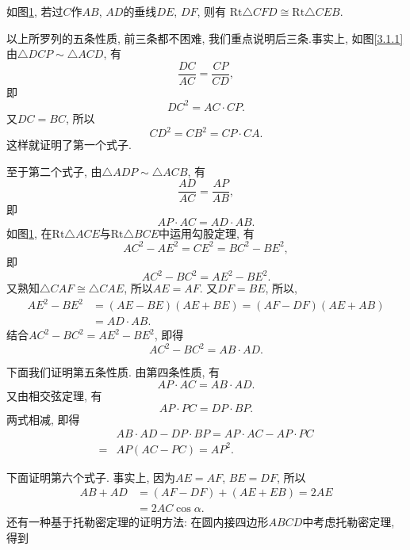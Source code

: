 \documentclass{book}
\begin{document}
\begin{paracol}{2}
\begin{figure}[H]
	\caption{}\label{3.2.2}
\end{figure}

\switchcolumn
如图\ref{3.2.2}, 若过$C$作$AB$, $AD$的垂线$DE$, $DF$, 则有
$\mathrm{Rt}\triangle CFD\cong\mathrm{Rt}\triangle CEB.$\par
以上所罗列的五条性质, 前三条都不困难, 我们重点说明后三条.事实上, 如图\ref{3.1.1}由$\triangle DCP\sim\triangle ACD$, 有
\[\frac{DC}{AC}=\frac{CP}{CD}, \]
即
\[DC^2=AC\cdot CP.\]
又$DC=BC$, 所以
\[CD^2=CB^2=CP\cdot CA.\]
这样就证明了第一个式子. \par
至于第二个式子, 由$\triangle ADP\sim\triangle ACB$, 有
\[\frac{AD}{AC}=\frac{AP}{AB},\]
即
\[AP\cdot AC=AD\cdot AB.\]
如图\ref{3.2.2}, 在$\mathrm{Rt}\triangle ACE$与$\mathrm{Rt}\triangle BCE$中运用勾股定理, 有
\[AC^2-AE^2=CE^2=BC^2-BE^2,\]
即
\[AC^2-BC^2=AE^2-BE^2.\]
又熟知$\triangle CAF\cong\triangle CAE$, 所以$AE=AF$. 又$DF=BE$, 所以,
\begin{align*}
	AE^2-BE^2&=(AE-BE)(AE+BE)=(AF-DF)(AE+AB)\\
	&=AD\cdot AB.
\end{align*}
结合$AC^2-BC^2=AE^2-BE^2$, 即得
\[AC^2-BC^2=AB\cdot AD.\]\par
下面我们证明第五条性质. 由第四条性质, 有
\[AP\cdot AC=AB\cdot AD.\]
又由相交弦定理, 有
\[AP\cdot PC=DP\cdot BP.\]
两式相减, 即得
\begin{align*}
	&AB\cdot AD-DP\cdot BP=AP\cdot AC-AP\cdot PC\\
	=&AP(AC-PC)=AP^2.
\end{align*}\par
下面证明第六个式子. 事实上, 因为$AE=AF$, $BE=DF$, 所以
\begin{align*}
	AB+AD&=(AF-DF)+(AE+EB)=2AE\\
	&=2AC\cos{\alpha.}
\end{align*}
还有一种基于托勒密定理的证明方法: 在圆内接四边形$ABCD$中考虑托勒密定理, 得到

\end{paracol}
\end{document}
